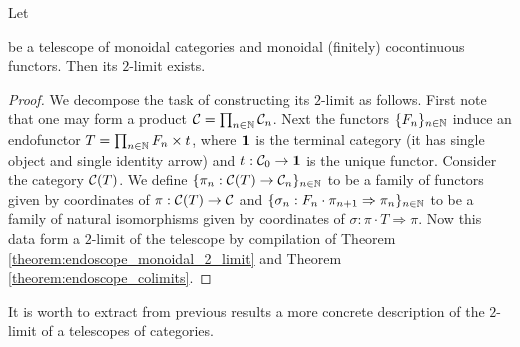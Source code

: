 \begin{corollary}\label{corollary:telescope_2_limits}
Let 
\begin{center}   
\end{center}
be a telescope of monoidal categories and monoidal (finitely) cocontinuous functors. Then its $2$-limit exists.
\end{corollary}
\begin{proof}
We decompose the task of constructing its $2$-limit as follows. First note that one may form a product ${\mathcal C} = \prod_{n\in {\mathbb N}}{\mathcal C}_n$. Next the functors $\{F_n\}_{n\in {\mathbb N}}$ induce an endofunctor $T = \prod_{n\in {\mathbb N}}F_n\times t$, where $\mathbf{1}$ is the terminal category (it has single object and single identity arrow) and $t:{\mathcal C}_0\rightarrow \mathbf{1}$ is the unique functor. Consider the category ${\mathcal C}(T)$. We define $\{\pi_n:{\mathcal C}(T)\rightarrow {\mathcal C}_n\}_{n\in {\mathbb N}}$ to be a family of functors given by coordinates of $\pi:{\mathcal C}(T)\rightarrow {\mathcal C}$ and $\{\sigma_n:F_n\cdot \pi_{n+1}\Rightarrow \pi_n\}_{n\in {\mathbb N}}$ to be a family of natural isomorphisms given by coordinates of $\sigma:\pi\cdot T\Rightarrow \pi$. Now this data form a $2$-limit of the telescope by compilation of Theorem \ref{theorem:endoscope_monoidal_2_limit} and Theorem \ref{theorem:endoscope_colimits}.
\end{proof}
\noindent
It is worth to extract from previous results a more concrete description of the $2$-limit of a telescopes of categories.

